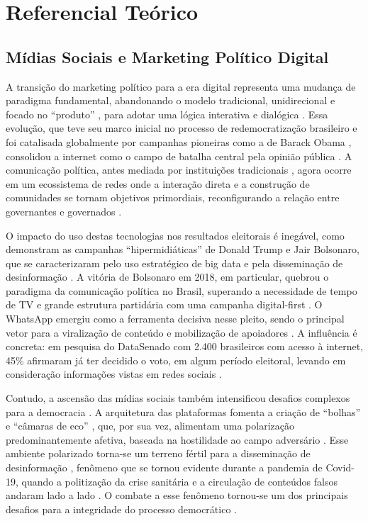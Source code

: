 \chapter{Referencial Teórico}\label{Referencial Teórico}

\section{Mídias Sociais e Marketing Político Digital}

A transição do marketing político para a era digital representa uma mudança de paradigma fundamental, abandonando o modelo tradicional, unidirecional e focado no ``produto'' \cite{newman2004}, para adotar uma lógica interativa e dialógica \cite{freitas2023}. Essa evolução, que teve seu marco inicial no processo de redemocratização brasileiro e foi catalisada globalmente por campanhas pioneiras como a de Barack Obama \cite{newman2016}, consolidou a internet como o campo de batalha central pela opinião pública \cite{ituassu2023}. A comunicação política, antes mediada por instituições tradicionais \cite{cook2005}, agora ocorre em um ecossistema de redes onde a interação direta e a construção de comunidades se tornam objetivos primordiais, reconfigurando a relação entre governantes e governados \cite{lipschultz2022}.

O impacto do uso destas tecnologias nos resultados eleitorais é inegável, como demonstram as campanhas ``hipermidiáticas'' de Donald Trump e Jair Bolsonaro, que se caracterizaram pelo uso estratégico de big data e pela disseminação de desinformação \cite{ituassu2023}. A vitória de Bolsonaro em 2018, em particular, quebrou o paradigma da comunicação política no Brasil, superando a necessidade de tempo de TV e grande estrutura partidária com uma campanha digital-first \cite{iasulaitis2022, fernandes2018}. O WhatsApp emergiu como a ferramenta decisiva nesse pleito, sendo o principal vetor para a viralização de conteúdo e mobilização de apoiadores \cite{ituassu2023}. A influência é concreta: em pesquisa do DataSenado com 2.400 brasileiros com acesso à internet, 45\% afirmaram já ter decidido o voto, em algum período eleitoral, levando em consideração informações vistas em redes sociais \cite{datasenado2019}.

Contudo, a ascensão das mídias sociais também intensificou desafios complexos para a democracia \cite{solonneto2024}. A arquitetura das plataformas fomenta a criação de ``bolhas'' e ``câmaras de eco'' \cite{barbera2020}, que, por sua vez, alimentam uma polarização predominantemente afetiva, baseada na hostilidade ao campo adversário \cite{fuks2022}. Esse ambiente polarizado torna-se um terreno fértil para a disseminação de desinformação \cite{guess2020}, fenômeno que se tornou evidente durante a pandemia de Covid-19, quando a politização da crise sanitária e a circulação de conteúdos falsos andaram lado a lado \cite{goulart2022, recuero2021}. O combate a esse fenômeno tornou-se um dos principais desafios para a integridade do processo democrático \cite{trasel2024}.

